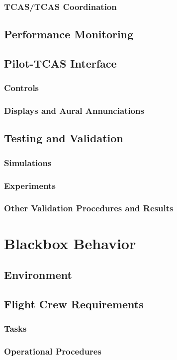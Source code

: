\documentclass[12pt]{report}
\begin{document}
\subsection{TCAS/TCAS Coordination}
\section{Performance Monitoring}
\section{Pilot-TCAS Interface}
\subsection{Controls}
\subsection{Displays and Aural Annunciations}
\section{Testing and Validation}
\subsection{Simulations}
\subsection{Experiments}
\subsection{Other Validation Procedures and Results}

\chapter{Blackbox Behavior}
\section{Environment}
\section{Flight Crew Requirements}
\subsection{Tasks}
\subsection{Operational Procedures}
\end{document}
